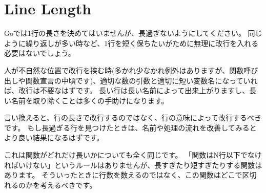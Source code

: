 \section{Line Length}

Goでは1行の長さを決めてはいませんが、長過ぎないようにしてください。 同じように繰り返しが多い時など、1行を短く保ちたいがために無理に改行を入れる必要はないでしょう。

人が不自然な位置で改行を挟む時(多かれ少なかれ例外はありますが、関数呼び出しや関数宣言の中頃です)、適切な数の引数と適切に短い変数名になっていれば、改行は不要なはずです。 長い行は長い名前によって出来上がりますし、長い名前を取り除くことは多くの手助けになります。

言い換えると、行の長さで改行するのではなく、行の意味によって改行するべきです。 もし長過ぎる行を見つけたときは、名前や処理の流れを改善してみるとより良い結果になるはずです。

これは関数がどれだけ長いかについても全く同じです。 「関数はN行以下でなければいけない」というルールはありませんが、長すぎたり短すぎたりする関数はあります。 そういったときに行数を数えるのではなく、この関数はどこで区切れるのかを考えるべきです。

